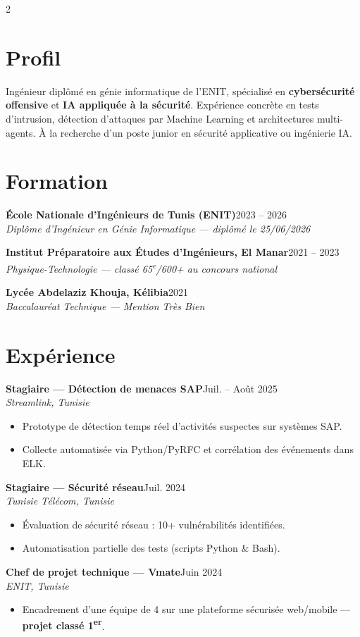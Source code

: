 \documentclass[a4paper,10pt]{article}
\newcommand{\role}[3]{%
  {\bfseries #1}\hfill{\small\color{graytext}#2}\\[1pt]
  {\itshape\small\color{accentlight}#3}\par\vspace{2pt}}
\begin{document}
\begin{paracol}{2}
\switchcolumn

\section{Profil}
{\small Ingénieur diplômé en génie informatique de l'ENIT, spécialisé en \textbf{cybersécurité offensive} et \textbf{IA appliquée à la sécurité}. Expérience concrète en tests d'intrusion, détection d'attaques par Machine Learning et architectures multi-agents. À la recherche d'un poste junior en sécurité applicative ou ingénierie IA.}

\section{Formation}
\role{École Nationale d'Ingénieurs de Tunis (ENIT)}{2023 -- 2026}{Diplôme d'Ingénieur en Génie Informatique — diplômé le 25/06/2026}
\role{Institut Préparatoire aux Études d'Ingénieurs, El Manar}{2021 -- 2023}{Physique-Technologie — classé 65\textsuperscript{e}/600+ au concours national}
\role{Lycée Abdelaziz Khouja, Kélibia}{2021}{Baccalauréat Technique — Mention Très Bien}

\section{Expérience}
\role{Stagiaire — Détection de menaces SAP}{Juil. -- Août 2025}{Streamlink, Tunisie}
\begin{itemize}
  \item Prototype de détection temps réel d'activités suspectes sur systèmes SAP.
  \item Collecte automatisée via Python/PyRFC et corrélation des événements dans ELK.
\end{itemize}
\role{Stagiaire — Sécurité réseau}{Juil. 2024}{Tunisie Télécom, Tunisie}
\begin{itemize}
  \item Évaluation de sécurité réseau : 10+ vulnérabilités identifiées.
  \item Automatisation partielle des tests (scripts Python \& Bash).
\end{itemize}
\role{Chef de projet technique — Vmate}{Juin 2024}{ENIT, Tunisie}
\begin{itemize}
  \item Encadrement d'une équipe de 4 sur une plateforme sécurisée web/mobile — \textbf{projet classé 1\textsuperscript{er}}.
\end{itemize}


\end{paracol}
\end{document}
